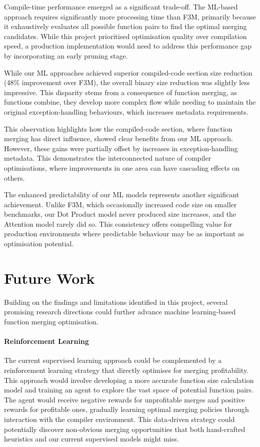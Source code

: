 Compile-time performance emerged as a significant trade-off. The ML-based approach requires significantly more processing time than F3M, primarily because it exhaustively evaluates all possible function pairs to find the optimal merging candidates. While this project prioritised optimisation quality over compilation speed, a production implementation would need to address this performance gap by incorporating an early pruning stage.

While our ML approaches achieved superior compiled-code section size reduction (48\% improvement over F3M), the overall binary size reduction was slightly less impressive. This disparity stems from a consequence of function merging, as functions combine, they develop more complex flow while needing to maintain the original exception-handling behaviours, which increases metadata requirements.

This observation highlights how the compiled-code section, where function merging has direct influence, showed clear benefits from our ML approach. However, these gains were partially offset by increases in exception-handling metadata. This demonstrates the interconnected nature of compiler optimisations, where improvements in one area can have cascading effects on others.

The enhanced predictability of our ML models represents another significant achievement. Unlike F3M, which occasionally increased code size on smaller benchmarks, our Dot Product model never produced size increases, and the Attention model rarely did so. This consistency offers compelling value for production environments where predictable behaviour may be as important as optimisation potential.

\section{Future Work} \label{Conc:FutureWork}
Building on the findings and limitations identified in this project, several promising research directions could further advance machine learning-based function merging optimisation.

\paragraph{Reinforcement Learning} The current supervised learning approach could be complemented by a reinforcement learning strategy that directly optimises for merging profitability. This approach would involve developing a more accurate function size calculation model and training an agent to explore the vast space of potential function pairs. The agent would receive negative rewards for unprofitable merges and positive rewards for profitable ones, gradually learning optimal merging policies through interaction with the compiler environment. This data-driven strategy could potentially discover non-obvious merging opportunities that both hand-crafted heuristics and our current supervised models might miss.

